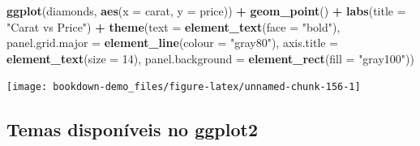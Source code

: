 \documentclass[]{book}
\newenvironment{Shaded}{\begin{snugshade}}{\end{snugshade}}
\newcommand{\KeywordTok}[1]{\textcolor[rgb]{0.13,0.29,0.53}{\textbf{#1}}}
\newcommand{\DataTypeTok}[1]{\textcolor[rgb]{0.13,0.29,0.53}{#1}}
\newcommand{\DecValTok}[1]{\textcolor[rgb]{0.00,0.00,0.81}{#1}}
\newcommand{\StringTok}[1]{\textcolor[rgb]{0.31,0.60,0.02}{#1}}
\newcommand{\OperatorTok}[1]{\textcolor[rgb]{0.81,0.36,0.00}{\textbf{#1}}}
\newcommand{\NormalTok}[1]{#1}
\begin{document}
\begin{Shaded}
\begin{Highlighting}[]
\KeywordTok{ggplot}\NormalTok{(diamonds, }\KeywordTok{aes}\NormalTok{(}\DataTypeTok{x =}\NormalTok{ carat, }\DataTypeTok{y =}\NormalTok{ price)) }\OperatorTok{+}
\StringTok{  }\KeywordTok{geom_point}\NormalTok{() }\OperatorTok{+}\StringTok{ }
\StringTok{  }\KeywordTok{labs}\NormalTok{(}\DataTypeTok{title =} \StringTok{"Carat vs Price"}\NormalTok{) }\OperatorTok{+}
\StringTok{  }\KeywordTok{theme}\NormalTok{(}\DataTypeTok{text =} \KeywordTok{element_text}\NormalTok{(}\DataTypeTok{face =} \StringTok{"bold"}\NormalTok{), }
        \DataTypeTok{panel.grid.major =} \KeywordTok{element_line}\NormalTok{(}\DataTypeTok{colour =} \StringTok{"gray80"}\NormalTok{), }
        \DataTypeTok{axis.title =} \KeywordTok{element_text}\NormalTok{(}\DataTypeTok{size =} \DecValTok{14}\NormalTok{),}
        \DataTypeTok{panel.background =} \KeywordTok{element_rect}\NormalTok{(}\DataTypeTok{fill =} \StringTok{"gray100"}\NormalTok{))}
\end{Highlighting}
\end{Shaded}

\begin{center}\texttt{[image: bookdown-demo\_files/figure-latex/unnamed-chunk-156-1]} \end{center}

\subsection{Temas disponíveis no
ggplot2}\label{temas-disponiveis-no-ggplot2}
\end{document}
